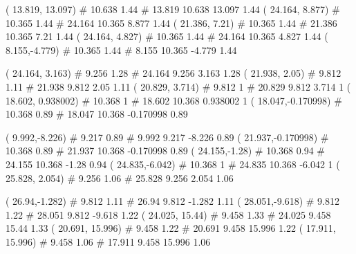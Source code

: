 \documentclass[a4paper,openbib,10pt]{article}
\newenvironment{treegraph}{\begin{graph}}{\end{graph}}
\begin{document}
\begin{treegraph}
  ( 13.819, 13.097) #     10.638    1.44
   #    13.819    10.638    13.097    1.44
  ( 24.164, 8.877) #     10.365    1.44
   #    24.164    10.365    8.877    1.44
  ( 21.386, 7.21) #     10.365    1.44
   #    21.386    10.365    7.21    1.44
  ( 24.164, 4.827) #     10.365    1.44
   #    24.164    10.365    4.827    1.44
  ( 8.155,-4.779) #     10.365    1.44
   #    8.155    10.365    -4.779    1.44

  ( 24.164, 3.163) #     9.256    1.28
   #    24.164    9.256    3.163    1.28
  ( 21.938, 2.05) #     9.812    1.11
   #    21.938    9.812    2.05    1.11
  ( 20.829, 3.714) #     9.812    1
   #    20.829    9.812    3.714    1
  ( 18.602, 0.938002) #     10.368    1
   #    18.602    10.368    0.938002    1
  ( 18.047,-0.170998) #     10.368    0.89
   #    18.047    10.368    -0.170998    0.89

  ( 9.992,-8.226) #     9.217    0.89
   #    9.992    9.217    -8.226    0.89
  ( 21.937,-0.170998) #     10.368    0.89
   #    21.937    10.368    -0.170998    0.89
  ( 24.155,-1.28) #     10.368    0.94
   #    24.155    10.368    -1.28    0.94
  ( 24.835,-6.042) #     10.368    1
   #    24.835    10.368    -6.042    1
  ( 25.828, 2.054) #     9.256    1.06
   #    25.828    9.256    2.054    1.06

  ( 26.94,-1.282) #     9.812    1.11
   #    26.94    9.812    -1.282    1.11
  ( 28.051,-9.618) #     9.812    1.22
   #    28.051    9.812    -9.618    1.22
  ( 24.025, 15.44) #     9.458    1.33
   #    24.025    9.458    15.44    1.33
  ( 20.691, 15.996) #     9.458    1.22
   #    20.691    9.458    15.996    1.22
  ( 17.911, 15.996) #     9.458    1.06
   #    17.911    9.458    15.996    1.06


\end{treegraph}
\end{document}
